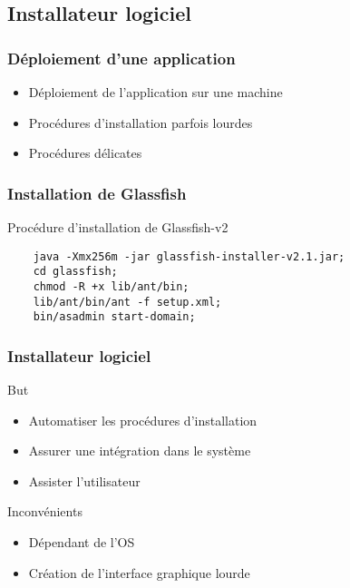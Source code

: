 \subsection{Installateur logiciel}
\begin{frame}\frametitle{Déploiement d'une application}
\begin{itemize}
 \item Déploiement de l'application sur une machine
 \item Procédures d'installation parfois lourdes
 \item Procédures délicates
\end{itemize}
\end{frame}
\begin{frame}[fragile]\frametitle{Installation de Glassfish}
\begin{beamerboxesrounded}{Proc\'edure d'installation de Glassfish-v2}
	\begin{verbatim}
	java -Xmx256m -jar glassfish-installer-v2.1.jar;
	cd glassfish;
	chmod -R +x lib/ant/bin;
	lib/ant/bin/ant -f setup.xml;
	bin/asadmin start-domain;
	\end{verbatim}
\end{beamerboxesrounded}
\end{frame}
\begin{frame}\frametitle{Installateur logiciel}
\begin{beamerboxesrounded}{But}
 \begin{itemize}
  \item Automatiser les procédures d'installation
  \item Assurer une intégration dans le système
  \item Assister l'utilisateur
 \end{itemize}
\end{beamerboxesrounded}
	\vfill
\begin{beamerboxesrounded}{Inconvénients}
 \begin{itemize}
  \item Dépendant de l'OS
  \item Création de l'interface graphique lourde
 \end{itemize}
\end{beamerboxesrounded}
\end{frame}
